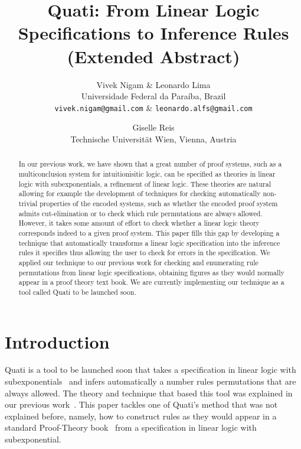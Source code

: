\documentclass[a4paper,10pt]{article}
\title{Quati: From Linear Logic Specifications to Inference Rules (Extended Abstract)}
\author{Vivek Nigam \& Leonardo Lima \\
Universidade Federal da Paraíba, Brazil\\
\texttt{vivek.nigam@gmail.com} \& \texttt{leonardo.alfs@gmail.com} 
\and Giselle Reis\\
Technische Universit\"at Wien, Vienna, Austria}
\begin{document}
\maketitle

\begin{abstract}
In our previous work, we have shown that a great number of proof systems, such 
as a multiconclusion system for intuitionisitic logic, can 
be specified as theories in linear logic with subexponentials, a refinement of linear logic. 
These theories are natural allowing for example the development of techniques for checking
automatically non-trivial properties of the encoded systems, such as whether the encoded proof system 
admits cut-elimination or to check which rule permutations are always allowed. 
However, it takes some amount of effort to check whether a linear logic theory corresponds
indeed to a given proof system. This paper fills this gap by developing a technique that automatically 
transforms a linear logic specification into the inference rules it specifies thus allowing
the user to check for errors in the specification. We applied our technique to our previous work for 
checking and enumerating rule permutations from linear logic specifications, obtaining figures
as they would normally appear in a proof theory text book. We are currently implementing our technique 
as a tool called Quati to be launched soon.
\end{abstract}

\section{Introduction}
Quati is a tool to be launched soon that takes a specification in linear logic with subexponentials~\cite{nigam09ppdp} 
and infers automatically a number rules permutations that are always allowed. The theory and technique that 
based this tool was explained in our previous work~\cite{nigam13iclp}. This paper tackles one of 
Quati's method that was not explained before, namely, how to construct rules as they would appear in 
a standard Proof-Theory book~\cite{troelstra96bpt} from a specification in linear logic with subexponential.
\end{document}
